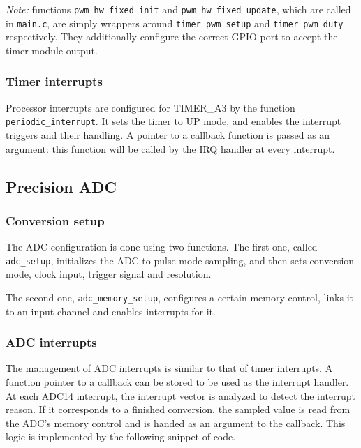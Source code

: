 \documentclass[12pt,a4paper]{article}
\begin{document}
\textit{Note:} functions \texttt{pwm\_hw\_fixed\_init} and \texttt{pwm\_hw\_fixed\_update}, which are called in \texttt{main.c}, are simply wrappers around \texttt{timer\_pwm\_setup} and \texttt{timer\_pwm\_duty} respectively. They additionally configure the correct GPIO port to accept the timer module output.

\subsubsection{Timer interrupts}

Processor interrupts are configured for TIMER\_A3 by the function \texttt{periodic\_interrupt}. It sets the timer to UP mode, and enables the interrupt triggers and their handling. A pointer to a callback function is passed as an argument: this function will be called by the IRQ handler at every interrupt.




\subsection{Precision ADC}

\subsubsection{Conversion setup}

The ADC configuration is done using two functions. The first one, called \texttt{adc\_setup}, initializes the ADC to pulse mode sampling, and then sets conversion mode, clock input, trigger signal and resolution.



The second one, \texttt{adc\_memory\_setup}, configures a certain memory control, links it to an input channel and enables interrupts for it.



\subsubsection{ADC interrupts}

The management of ADC interrupts is similar to that of timer interrupts. A function pointer to a callback can be stored to be used as the interrupt handler. At each ADC14 interrupt, the interrupt vector is analyzed to detect the interrupt reason. If it corresponds to a finished conversion, the sampled value is read from the ADC's memory control and is handed as an argument to the callback. This logic is implemented by the following snippet of code.
\end{document}
